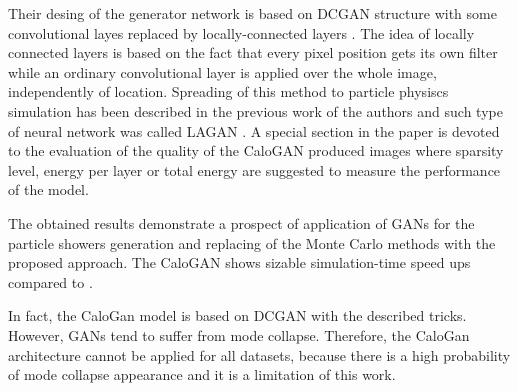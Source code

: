Their desing of the generator network is based on DCGAN structure \cite{radford2015unsupervised} with some convolutional layes replaced by locally-connected layers \cite{taigman2014deepface}. The idea of locally connected layers is based on the fact that every pixel position gets its own filter while an ordinary convolutional layer is applied over the whole image, independently of location. Spreading of this method to particle physiscs simulation has been described in the previous work of the authors and such type of neural network was called LAGAN \cite{de2017learning}. A special section in the paper is devoted to the evaluation of the quality of the CaloGAN produced images where  sparsity level,  energy per layer or total energy are suggested to measure the performance of the model. 

The obtained results demonstrate a prospect of application of GANs for the particle showers generation and replacing of the Monte Carlo methods with the proposed approach. The CaloGAN shows sizable simulation-time speed ups compared to \geant. 

In fact, the CaloGan model is based on DCGAN with the described tricks. However, GANs tend to suffer from mode collapse. Therefore, the CaloGan architecture cannot be applied for all datasets, because there is a high probability of mode collapse appearance and it is a limitation of this work.
